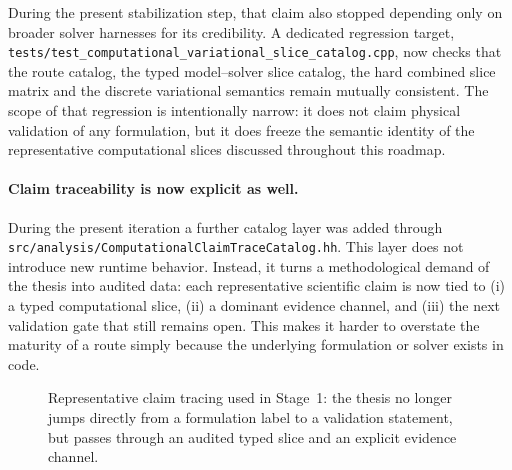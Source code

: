 During the present stabilization step, that claim also stopped depending only
on broader solver harnesses for its credibility.  A dedicated regression target,
\texttt{tests/test\_computational\_variational\_slice\_catalog.cpp}, now checks
that the route catalog, the typed model--solver slice catalog, the hard
combined slice matrix and the discrete variational semantics remain mutually
consistent.  The scope of that regression is intentionally narrow: it does not
claim physical validation of any formulation, but it does freeze the semantic
identity of the representative computational slices discussed throughout this
roadmap.

\paragraph{Claim traceability is now explicit as well.}
During the present iteration a further catalog layer was added through
\texttt{src/analysis/ComputationalClaimTraceCatalog.hh}.  This layer does not
introduce new runtime behavior.  Instead, it turns a methodological demand of
the thesis into audited data: each representative scientific claim is now tied
to (i) a typed computational slice, (ii) a dominant evidence channel, and
(iii) the next validation gate that still remains open.  This makes it harder
to overstate the maturity of a route simply because the underlying formulation
or solver exists in code.

\begin{figure}[htbp]
  \centering
  \caption{Representative claim tracing used in Stage~1: the thesis no longer
  jumps directly from a formulation label to a validation statement, but passes
  through an audited typed slice and an explicit evidence channel.}
  \label{fig:stage1-claim-trace}
\end{figure}

